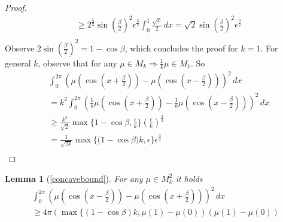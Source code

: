 \documentclass[twoside]{article} \usepackage{aistats2017}
\newtheorem*{lemma*}{Lemma}
\begin{document}
\begin{proof}
\begin{align*}
        &\geq 2^{\frac{5}{2}}\sin(\frac{\beta}{2})^2\epsilon^{\frac{3}{2}}\int_{0}^{1}\frac{\sqrt{x}}{2}\,dx=\sqrt{2}\sin(\frac{\beta}{2})^2\epsilon^{\frac{3}{2}}\\
    \end{align*}
    Observe $2\sin(\frac{\beta}{2})^2 = 1-\cos{\beta}$, which concludes the proof for $k=1$.
    For general $k$, observe that for any $\mu\in M_k \Rightarrow \frac{1}{k}\mu\in M_1$. So
    \begin{align*}
 &\int_{0}^{2\pi}\left(\mu(\cos(x+\frac{\beta}{2}))-\mu( \cos(x-\frac{\beta}{2}))\right)^2\, dx\\
 &=k^2\int_{0}^{2\pi}\left(\frac{1}{k}\mu(\cos(x+\frac{\beta}{2}))-\frac{1}{k}\mu( \cos(x-\frac{\beta}{2}))\right)^2\, dx\\
 &\geq \frac{k^2}{\sqrt{2}} \max\{1-\cos{\beta},\frac{\epsilon}{k}\}(\frac{\epsilon}{k})^{\frac{3}{2}}\\
& = \frac{1}{\sqrt{2k}} \max\{(1-\cos{\beta)k},\epsilon\}\epsilon^{\frac{3}{2}}\\
    \end{align*}
    \end{proof}
    \begin{lemma*}[\ref{concavebound}]
    For any $\mu\in M_k^2$ it holds
\begin{align*}
            \int_{0}^{2\pi}\left(\mu(\cos(x-\frac{\beta}{2}))-\mu( \cos(x+\frac{\beta}{2}))\right)^2\, dx\\
            \geq 4\pi(\max\{(1-\cos{\beta})k,\mu(1)-\mu(0))(\mu(1)-\mu(0))
\end{align*}
\end{lemma*}
\end{document}
